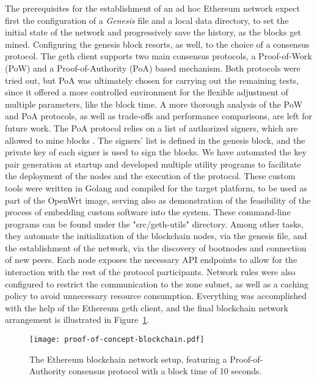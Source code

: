 The prerequisites for the establishment of an ad hoc Ethereum network expect first the configuration of a \emph{Genesis} file and a local data directory, to set the initial state of the network and progressively save the history, as the blocks get mined. Configuring the genesis block resorts, as well, to the choice of a consensus protocol. The geth client supports two main consensus protocols, a Proof-of-Work (PoW) and a Proof-of-Authority (PoA) based mechanism. Both protocols were tried out, but PoA was ultimately chosen for carrying out the remaining tests, since it offered a more controlled environment for the flexible adjustment of multiple parameters, like the block time. A more thorough analysis of the PoW and PoA protocols, as well as trade-offs and performance comparisons, are left for future work. The PoA protocol relies on a list of authorized signers, which are allowed to mine blocks \cite{clique-eth}. The signers' list is defined in the genesis block, and the private key of each signer is used to sign the blocks. We have automated the key pair generation at startup and developed multiple utility programs to facilitate the deployment of the nodes and the execution of the protocol. These custom tools were written in Golang and compiled for the target platform, to be used as part of the OpenWrt image, serving also as demonstration of the feasibility of the process of embedding custom software into the system. These command-line programs can be found under the "src/geth-utils" directory. Among other tasks, they automate the initialization of the blockchain nodes, via the genesis file, and the establishment of the network, via the discovery of bootnodes and connection of new peers. Each node exposes the necessary API endpoints to allow for the interaction with the rest of the protocol participants. Network rules were also configured to restrict the communication to the zone subnet, as well as a caching policy to avoid unnecessary resource consumption. Everything was accomplished with the help of the Ethereum geth client, and the final blockchain network arrangement is illustrated in Figure~\ref{fig:pol-implementation:blockchain-network}.

\begin{figure}[h!]
    \begin{center}
    \texttt{[image: proof-of-concept-blockchain.pdf]}
    \caption{The Ethereum blockchain network setup, featuring a Proof-of-Authority consensus protocol with a block time of 10 seconds.}
    \label{fig:pol-implementation:blockchain-network}
    \end{center}
\end{figure}

